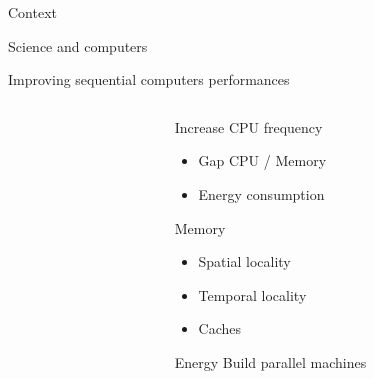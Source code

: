 \documentclass[xcolor={usenames,dvipsnames},hyperref={pdfusetitle}]{beamer}
\begin{document}
\begin{section}{Context}

\begin{frame}{Science and computers}
    
\end{frame}

\begin{frame}{Improving sequential computers performances}
    \begin{columns}
        \begin{column}{.45\textwidth}
            \centering
            
            \begin{block}{}
            \end{block}
        \end{column}
        \begin{column}{.45\textwidth}
            \pause
            \begin{block}{Increase CPU frequency}
                \begin{itemize}
                    \item Gap CPU / Memory
                    \item Energy consumption
                \end{itemize}
            \end{block}
            \pause
            \begin{alertblock}{Memory}
                \begin{itemize}
                    \item Spatial locality
                    \item Temporal locality
                    \item Caches
                \end{itemize}
            \end{alertblock}
            \pause
            \begin{alertblock}{Energy}
                Build parallel machines
            \end{alertblock}
        \end{column}
    \end{columns}
\end{frame}


\end{section}
\end{document}
